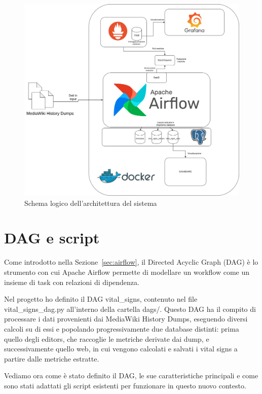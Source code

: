 \begin{figure}[ht]
    \centering
    \includegraphics[width=\textwidth]{img/vital-signs-pipeline.drawio.png}
    \caption{Schema logico dell'architettura del sistema}
    \label{fig:architettura_sistema}
\end{figure}

\section{DAG e script}
\label{sec:dag_script}

Come introdotto nella Sezione~\ref{sec:airflow}, il Directed Acyclic Graph (DAG) è lo strumento con cui Apache Airflow permette di modellare un workflow come un insieme di task con relazioni di dipendenza.

Nel progetto ho definito il DAG vital\_signs, contenuto nel file vital\_signs\_dag.py all’interno della cartella dags/. Questo DAG ha il compito di processare i dati provenienti dai MediaWiki History Dumps, eseguendo diversi calcoli su di essi e popolando progressivamente due database distinti: prima quello degli editors, che raccoglie le metriche derivate dai dump, e successivamente quello web, in cui vengono calcolati e salvati i vital signs a partire dalle metriche estratte.

Vediamo ora come è stato definito il DAG, le sue caratteristiche principali e come sono stati adattati gli script esistenti per funzionare in questo nuovo contesto.


